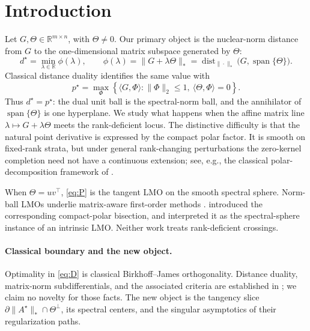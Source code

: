\section{Introduction}
\label{sec:intro}

Let \(G,\Theta\in\mathbb R^{m\times n}\), with \(\Theta\ne0\).  Our primary
object is the nuclear-norm distance from \(G\) to the one-dimensional matrix
subspace generated by \(\Theta\):
\begin{equation}
 d^\star
 =\min_{\lambda\in\mathbb R}\phi(\lambda),
 \qquad
 \phi(\lambda)=\|G+\lambda\Theta\|_*
 =\operatorname{dist}_{\|\cdot\|_*}
   \bigl(G,\operatorname{span}\{\Theta\}\bigr).
 \label{eq:D}
\end{equation}
Classical distance duality identifies the same value with
\begin{equation}
 p^\star=
 \max_{\Phi}
 \left\{\langle G,\Phi\rangle:
 \|\Phi\|_2\le1,\ \langle\Theta,\Phi\rangle=0\right\}.
 \label{eq:P}
\end{equation}
Thus \(d^\star=p^\star\): the dual unit ball is the spectral-norm ball, and
the annihilator of \(\operatorname{span}\{\Theta\}\) is one hyperplane.  We
study what happens when the affine matrix line
\(\lambda\mapsto G+\lambda\Theta\) meets the rank-deficient locus.  The
distinctive difficulty is that the natural point derivative is expressed by
the compact polar factor.  It is smooth on fixed-rank strata, but under
general rank-changing perturbations the zero-kernel completion need not have a
continuous extension; see, e.g., the classical polar-decomposition framework
of \citet{higham1986polar}.

When \(\Theta=uv^\top\), \eqref{eq:P} is the tangent LMO on the smooth
spectral sphere.  Norm-ball LMOs underlie matrix-aware first-order methods
\citep{pethick2025lmo}.  \citet{xie2026controlled} introduced the corresponding
compact-polar bisection, and \citet[Appendix P.5]{li2026intrinsic} interpreted
it as the spectral-sphere instance of an intrinsic LMO.  Neither work treats
rank-deficient crossings.

\paragraph{Classical boundary and the new object.}
Optimality in \eqref{eq:D} is classical Birkhoff--James orthogonality.
Distance duality, matrix-norm subdifferentials, and the associated criteria
are established in
\citep{singer1970best,watson1992subdifferential,zietak1993faces,
watson1993kyfan,bhatia1999orthogonality,grover2014distance,
johnston2022trace,grover2026kyfan}; we claim no novelty for those facts.
The new object is the tangency slice
\(\partial\|A^\star\|_*\cap\Theta^\perp\), its spectral centers, and the
singular asymptotics of their regularization paths.

